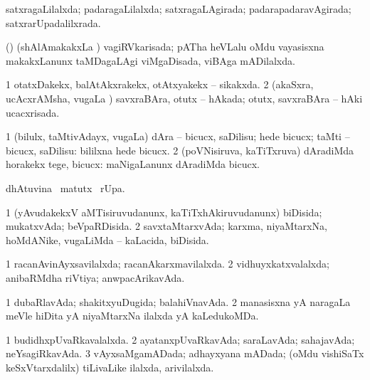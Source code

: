 \bentry
{} 
\gl{\gu}
\expl{}
\bmng
satxragaLilalxda; padaragaLilalxda; satxragaLAgirada; padarapadaravAgirada; satxrarUpadalilxrada. 
\emng
\eentry

\bentry
{} 
\gl{\gu}
\expl{}
\bmng
(\birx) (shAlAmakakxLa \vi) vagiRVkarisada; pATha heVLalu oMdu vayasisxna makakxLanunx taMDagaLAgi viMgaDisada, viBAga mADilalxda. 
\emng
\eentry

\bentry
{} 
\gl{\gu}
\expl{}
\bmng
\bnum
\num{1} otatxDakekx, balAtAkxrakekx, otAtxyakekx -- sikakxda. 
\num{2} (akaSxra, ucAcxrAMsha, \mo vugaLa \vi) savxraBAra, otutx -- hAkada; otutx, savxraBAra -- hAki ucacxrisada. 
\enum
\emng
\eentry

\bentry
{} 
\gl{\akirx}
\bmng
\bnum
\num{1} (bilulx, taMtivAdayx, \mo vugaLa) dAra -- bicucx, saDilisu; hede bicucx; taMti -- bicucx, saDilisu:  bililxna hede bicucx. 
\num{2} (poVNisiruva, kaTiTxruva) dAradiMda horakekx tege, bicucx:  maNigaLanunx dAradiMda bicucx. 
\enum
\emng
\eentry

\bentry
{} 
\gl{\kirx}
\expl{}
\bmng
{} dhAtuvina \BU\ matutx \BUkaq\ rUpa. 
\emng
\eentry

\bentry
{} 
\gl{\gu}
\expl{}
\bmng
\bnum
\num{1} (yAvudakekxV aMTisiruvudanunx, kaTiTxhAkiruvudanunx) biDisida; mukatxvAda; beVpaRDisida. 
\num{2} savxtaMtarxvAda; karxma, niyaMtarxNa, hoMdANike, \mo vugaLiMda -- kaLacida, biDisida. 
\enum
\emng
\eentry

\bentry
{} 
\gl{\gu}
\expl{}
\bmng
\bnum
\num{1} racanAvinAyxsavilalxda; racanAkarxmavilalxda. 
\num{2} vidhuyxkatxvalalxda; anibaRMdha riVtiya; anwpacArikavAda. 
\enum
\emng
\eentry

\bentry
{} 
\gl{\gu}
\expl{}
\bmng
\bnum
\num{1} dubaRlavAda; shakitxyuDugida; balahiVnavAda. 
\num{2} manasisxna yA naragaLa meVle hiDita yA niyaMtarxNa ilalxda yA kaLedukoMDa. 
\enum
\emng
\eentry

\bentry
{} 
\gl{\gu}
\expl{}
\bmng
\bnum
\num{1} budidhxpUvaRkavalalxda. 
\num{2} ayatanxpUvaRkavAda; saraLavAda; sahajavAda; neYsagiRkavAda. 
\num{3} vAyxsaMgamADada; adhayxyana mADada; (oMdu vishiSaTx keSxVtarxdalilx) tiLivaLike ilalxda, arivilalxda. 
\enum
\emng
\eentry


